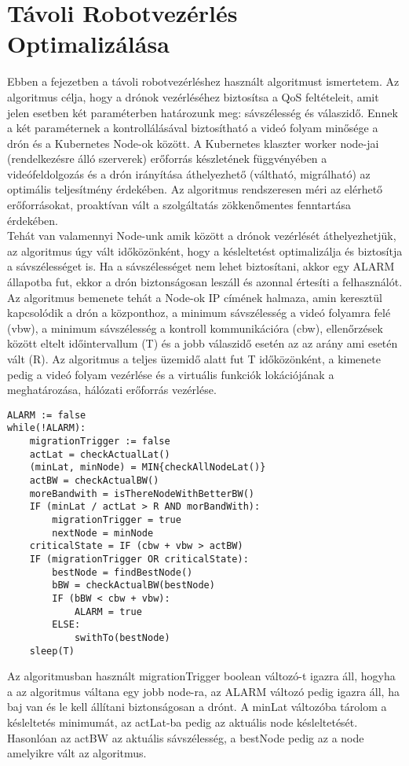 \chapter{Távoli Robotvezérlés Optimalizálása}

Ebben a fejezetben a távoli robotvezérléshez használt algoritmust ismertetem. Az algoritmus célja, hogy a drónok vezérléséhez biztosítsa a QoS feltételeit, amit jelen esetben két paraméterben határozunk meg: sávszélesség és válaszidő. Ennek a két paraméternek a kontrollálásával biztosítható a videó folyam minősége a drón és a Kubernetes Node-ok között. A Kubernetes klaszter worker node-jai (rendelkezésre álló szerverek) erőforrás készletének függvényében a videófeldolgozás és a drón irányítása áthelyezhető (váltható, migrálható) az optimális teljesítmény érdekében. Az algoritmus rendszeresen méri az elérhető erőforrásokat, proaktívan vált a szolgáltatás zökkenőmentes fenntartása érdekében. \\

\noindent
Tehát van valamennyi Node-unk amik között a drónok vezérlését áthelyezhetjük, az algoritmus úgy vált időközönként, hogy a késleltetést optimalizálja és biztosítja a sávszélességet is. Ha a sávszélességet nem lehet biztosítani, akkor egy ALARM állapotba fut, ekkor a drón biztonságosan leszáll és azonnal értesíti a felhasználót. \\

\noindent
Az algoritmus bemenete tehát a Node-ok IP címének halmaza, amin keresztül kapcsolódik a drón a központhoz, a minimum sávszélesség a videó folyamra felé (vbw), a minimum sávszélesség a kontroll kommunikációra (cbw), ellenőrzések között eltelt időintervallum (T) és a jobb válaszidő esetén az az arány ami esetén vált (R). Az algoritmus a teljes üzemidő alatt fut T időközönként, a kimenete pedig a videó folyam vezérlése és a virtuális funkciók lokációjának a meghatározása, hálózati erőforrás vezérlése.

\begin{lstlisting}[caption={Az optimalizáló algoritmus}]
ALARM := false
while(!ALARM):
	migrationTrigger := false
	actLat = checkActualLat()
	(minLat, minNode) = MIN{checkAllNodeLat()}
	actBW = checkActualBW()
	moreBandwith = isThereNodeWithBetterBW()
	IF (minLat / actLat > R AND morBandWith):
		migrationTrigger = true
		nextNode = minNode
	criticalState = IF (cbw + vbw > actBW)
	IF (migrationTrigger OR criticalState):
		bestNode = findBestNode()
		bBW = checkActualBW(bestNode)
		IF (bBW < cbw + vbw):
			ALARM = true
		ELSE:
			swithTo(bestNode)
	sleep(T)
\end{lstlisting}

Az algoritmusban használt migrationTrigger boolean változó-t igazra áll, hogyha a az algoritmus váltana egy jobb node-ra, az ALARM változó pedig igazra áll, ha baj van és le kell állítani biztonságosan a drónt. A minLat változóba tárolom a késleltetés minimumát, az actLat-ba pedig az aktuális node késleltetését. Hasonlóan az actBW az aktuális sávszélesség, a bestNode pedig az a node amelyikre vált az algoritmus.